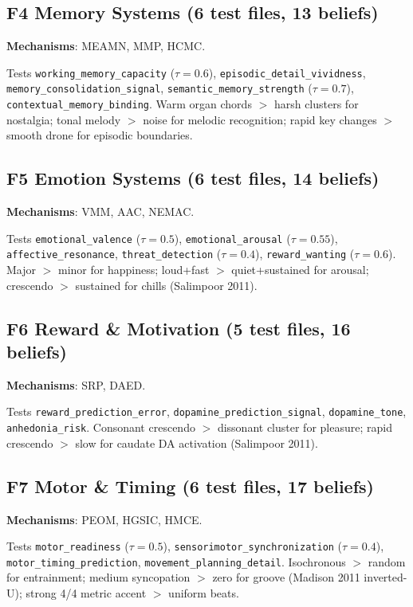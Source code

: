 \documentclass[10pt,twocolumn]{article}
\newcommand{\fn}[1]{\textbf{F#1}}
\newcommand{\belief}[1]{\texttt{#1}}
\begin{document}
\subsection{\fn{4} Memory Systems (6 test files, 13 beliefs)}

\textbf{Mechanisms}: MEAMN, MMP, HCMC.

Tests \belief{working\_memory\_capacity} ($\tau\!=\!0.6$), \belief{episodic\_detail\_vividness}, \belief{memory\_consolidation\_signal}, \belief{semantic\_memory\_strength} ($\tau\!=\!0.7$), \belief{contextual\_memory\_binding}. Warm organ chords $>$ harsh clusters for nostalgia; tonal melody $>$ noise for melodic recognition; rapid key changes $>$ smooth drone for episodic boundaries.

\subsection{\fn{5} Emotion Systems (6 test files, 14 beliefs)}

\textbf{Mechanisms}: VMM, AAC, NEMAC.

Tests \belief{emotional\_valence} ($\tau\!=\!0.5$), \belief{emotional\_arousal} ($\tau\!=\!0.55$), \belief{affective\_resonance}, \belief{threat\_detection} ($\tau\!=\!0.4$), \belief{reward\_wanting} ($\tau\!=\!0.6$). Major $>$ minor for happiness; loud+fast $>$ quiet+sustained for arousal; crescendo $>$ sustained for chills (Salimpoor 2011).

\subsection{\fn{6} Reward \& Motivation (5 test files, 16 beliefs)}

\textbf{Mechanisms}: SRP, DAED.

Tests \belief{reward\_prediction\_error}, \belief{dopamine\_prediction\_signal}, \belief{dopamine\_tone}, \belief{anhedonia\_risk}. Consonant crescendo $>$ dissonant cluster for pleasure; rapid crescendo $>$ slow for caudate DA activation (Salimpoor 2011).

\subsection{\fn{7} Motor \& Timing (6 test files, 17 beliefs)}

\textbf{Mechanisms}: PEOM, HGSIC, HMCE.

Tests \belief{motor\_readiness} ($\tau\!=\!0.5$), \belief{sensorimotor\_synchronization} ($\tau\!=\!0.4$), \belief{motor\_timing\_prediction}, \belief{movement\_planning\_detail}. Isochronous $>$ random for entrainment; medium syncopation $>$ zero for groove (Madison 2011 inverted-U); strong 4/4 metric accent $>$ uniform beats.
\end{document}
